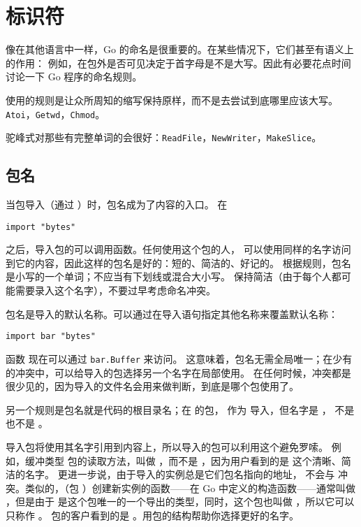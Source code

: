 \section{标识符}
像在其他语言中一样，Go 的命名是很重要的。在某些情况下，它们甚至有语义上的作用：
例如，在包外是否可见决定于首字母是不是大写。因此有必要花点时间讨论一下 Go 程序的命名规则。

使用的规则是让众所周知的缩写保持原样，而不是去尝试到底哪里应该大写。
\lstinline{Atoi}，\lstinline{Getwd}，\lstinline{Chmod}。

驼峰式对那些有完整单词的会很好：\lstinline{ReadFile}，\lstinline{NewWriter}，\lstinline{MakeSlice}。

\subsection{包名}
当包导入（通过 ）时，包名成为了内容的入口。
在 
\begin{lstlisting}
import "bytes"
\end{lstlisting}
之后，导入包的可以调用函数。任何使用这个包的人，
可以使用同样的名字访问到它的内容，因此这样的包名是好的：短的、简洁的、好记的。
根据规则，包名是小写的一个单词；不应当有下划线或混合大小写。
保持简洁（由于每个人都可能需要录入这个名字），不要过早考虑命名冲突。

包名是导入的默认名称。可以通过在导入语句指定其他名称来覆盖默认名称：
\begin{lstlisting}
import bar "bytes"
\end{lstlisting}
函数  现在可以通过 \lstinline{bar.Buffer} 来访问。
这意味着，包名无需全局唯一；在少有的冲突中，可以给导入的包选择另一个名字在局部使用。
在任何时候，冲突都是很少见的，因为导入的文件名会用来做判断，到底是哪个包使用了。

另一个规则是包名就是代码的根目录名；在  的包，
作为  导入，但名字是 ，
不是  也不是 。

导入包将使用其名字引用到内容上，所以导入的包可以利用这个避免罗嗦。
例如，缓冲类型  包的读取方法，叫做 ，而不是
，因为用户看到的是  这个清晰、简洁的名字。
更进一步说，由于导入的实例总是它们包名指向的地址， 不会与
 冲突。类似的，（包 ）创建新实例的函数——在 Go 中定义的构造函数——通常叫做
，但是由于  是这个包唯一的一个导出的类型，同时，这个包也叫做
，所以它可以只称作 。
包的客户看到的是 。用包的结构帮助你选择更好的名字。


